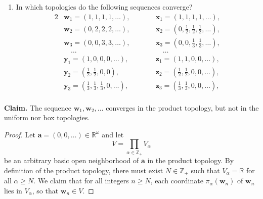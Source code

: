 \documentclass[a4paper,10pt]{article}
\newcommand{\bx}{\mathbf{x}}
\newcommand{\by}{\mathbf{y}}
\newcommand{\bz}{\mathbf{z}}
\newcommand{\bw}{\mathbf{w}}
\newcommand{\ZZ}{\mathbb{Z}}
\newcommand{\RR}{\mathbb{R}}
\begin{document}
\begin{solution}
    \begin{enumerate}[label={(\alph*)}, align=left, leftmargin=\parindent, listparindent=\parindent, labelwidth=0pt, itemindent=!]
        \addtocounter{enumi}{1} 
        \item In which topologies do the following sequences converge?
        \begin{alignat*}{2}
            & \bw_1 = (1, 1, 1, 1, \ldots),\qquad   & & \bx_1 = (1, 1, 1, 1, \ldots), \\
            & \bw_2 = (0, 2, 2, 2, \ldots),\qquad   & & \bx_2 = (0, \tfrac{1}{2}, \tfrac{1}{2}, \tfrac{1}{2}, \ldots), \\
            & \bw_3 = (0, 0, 3, 3, \ldots),\qquad   & & \bx_3 = (0, 0, \tfrac{1}{3}, \tfrac{1}{3}, \ldots), \\
            & \quad\ldots                           & & \quad\ldots \\
            & \by_1 = (1, 0, 0, 0, \ldots),\qquad   & & \bz_1 = (1, 1, 0, 0, \ldots), \\
            & \by_2 = (\tfrac{1}{2}, \tfrac{1}{2}, 0, 0),                       & & \bz_2 = (\tfrac{1}{2}, \tfrac{1}{2}, 0, 0, \ldots), \\
            & \by_3 = (\tfrac{1}{3}, \tfrac{1}{3}, \tfrac{1}{3}, 0, \ldots),    & & \bz_3 = (\tfrac{1}{3}, \tfrac{1}{3}, 0, 0, \ldots), \\
        \end{alignat*}
    \end{enumerate}
    \textbf{Claim.} The sequence $\bw_1, \bw_2, \ldots$ converges in the product topology, but not in the uniform nor box topologies.
    \begin{proof}
        Let $\mathbf{a} = (0, 0, \ldots) \in \RR^\omega$ and let
        \begin{equation*}
            V = \prod_{\alpha \in \ZZ_+} V_\alpha
        \end{equation*}
        be an arbitrary basic open neighborhood of $\mathbf{a}$ in the product topology.
        By definition of the product topology, there must exist $N \in \ZZ_+$ such that $V_\alpha = \RR$ for all $\alpha \geq N$.
        We claim that for all integers $n \geq N$, each coordinate $\pi_\alpha(\bw_n)$ of $\bw_n$ lies in $V_\alpha$, so that $\bw_n \in V$.


\end{proof}
\end{solution}
\end{document}
